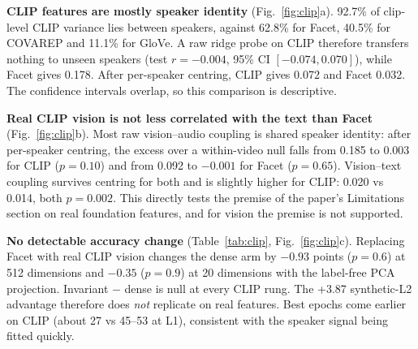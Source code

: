 \documentclass[lettersize,journal]{IEEEtran}
\begin{document}
\textbf{CLIP features are mostly speaker identity} (Fig.~\ref{fig:clip}a). 92.7\% of clip-level CLIP variance lies between speakers, against 62.8\% for Facet, 40.5\% for COVAREP and 11.1\% for GloVe. A raw ridge probe on CLIP therefore transfers nothing to unseen speakers (test $r=-0.004$, 95\% CI $[-0.074, 0.070]$), while Facet gives 0.178. After per-speaker centring, CLIP gives 0.072 and Facet 0.032. The confidence intervals overlap, so this comparison is descriptive.

\textbf{Real CLIP vision is not less correlated with the text than Facet} (Fig.~\ref{fig:clip}b). Most raw vision--audio coupling is shared speaker identity: after per-speaker centring, the excess over a within-video null falls from 0.185 to 0.003 for CLIP ($p=0.10$) and from 0.092 to $-0.001$ for Facet ($p=0.65$). Vision--text coupling survives centring for both and is slightly higher for CLIP: 0.020 vs 0.014, both $p=0.002$. This directly tests the premise of the paper's Limitations section on real foundation features, and for vision the premise is not supported.

\textbf{No detectable accuracy change} (Table~\ref{tab:clip}, Fig.~\ref{fig:clip}c). Replacing Facet with real CLIP vision changes the dense arm by $-0.93$ points ($p=0.6$) at 512 dimensions and $-0.35$ ($p=0.9$) at 20 dimensions with the label-free PCA projection. Invariant $-$ dense is null at every CLIP rung. The +3.87 synthetic-L2 advantage therefore does \emph{not} replicate on real features. Best epochs come earlier on CLIP (about 27 vs 45--53 at L1), consistent with the speaker signal being fitted quickly.

\begin{table}[!t]
\caption{Real-CLIP rungs: six-case forced mean Acc-2 (\%), mean $\pm$ SD over 3 seeds; one commit (\texttt{85eddde}), complete-data validation. $p$ is the exact permutation test.\label{tab:clip}}
\centering
\setlength{\tabcolsep}{4pt}
\end{table}
\end{document}

